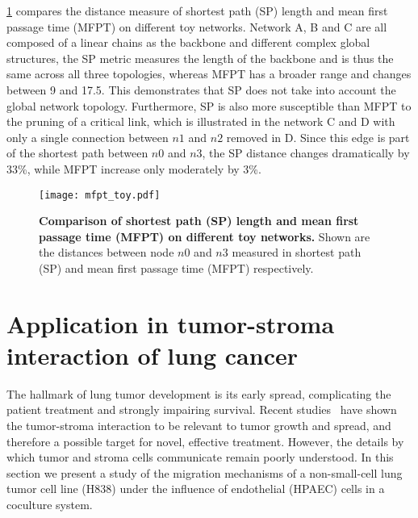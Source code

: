 \ref{fig:mfpt_toy} compares the distance measure of shortest path (SP) length
and mean first passage time (MFPT) on different toy networks. Network A, B and
C are all composed of a linear chains as the backbone and different complex 
global structures, the SP metric measures the length of the backbone and is 
thus the same across all three topologies, whereas MFPT has a broader range
and changes between 9 and 17.5. This demonstrates that SP does not take into
account the global network topology. Furthermore, SP is also more susceptible
than MFPT to the pruning of a critical link, which is illustrated in the 
network C and D with only a single connection between $n1$ and $n2$ removed
in D. Since this edge is part of the shortest path between $n0$ and $n3$, the
SP distance changes dramatically by 33\%, while MFPT increase only moderately
by 3\%.

\begin{figure}[!ht]
\begin{center}
\texttt{[image: mfpt\_toy.pdf]}
\end{center}
\caption[Toy example of SP and MFPT on different topologies]{
{\bf Comparison of shortest path (SP) length and mean first passage time 
(MFPT) on different toy networks.}
Shown are the distances between node $n0$ and $n3$ measured in shortest path 
(SP) and mean first passage time (MFPT) respectively.
}
\label{fig:mfpt_toy}
\end{figure}

\section{Application in tumor-stroma interaction of lung cancer}

The hallmark of lung tumor development is its early spread, 
complicating the patient treatment and strongly impairing survival.
Recent studies~\citep{Mueller2004} have shown the tumor-stroma interaction to be relevant to 
tumor growth and spread, and therefore a possible target for
novel, effective treatment. 
However, 
the details by which tumor and stroma cells communicate remain poorly 
understood. In this section we present a study
of the migration mechanisms of a non-small-cell lung 
tumor cell line (H838) under the influence of endothelial (HPAEC) cells 
in a coculture system.

